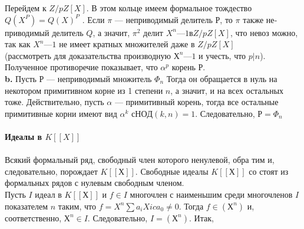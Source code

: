 \documentclass{../../template/mai_book}
\begin{document}
{{\hspace*{0pt}Перейдем к $Z/pZ[X]$. В этом кольце имеем формальное тождество\linebreak
$Q(X^{P}) = Q(X)^{P}$ . Если $\pi$ --- неприводимый делитель $Р$, то $\pi$ также не­\linebreak
приводимый делитель $Q$, а значит, $\pi^{2}$ делит $X^{n} — 1 в Z/pZ[X]$, что невоз­\linebreak
можно, так как $X^{n} — 1$ не имеет кратных множителей даже в $Z/pZ[X]$\\
\newpage
\noindent (рассмотреть для доказательства производную $Х^{n} — 1$ и учесть, \linebreak
что $p|n$). Полученное противоречие показывает, что $\alpha^{p}$ корень $Р$.\\
\hspace*{15pt}\textbf{b.} Пусть $Р$ — неприводимый множитель $\Phi_n$ Тогда он обращается\linebreak
в нуль на некотором примитивном корне из 1 степени $n$, а значит, и на\linebreak
всех остальных тоже. Действительно, пусть $\alpha$ — примитивный корень,\linebreak
тогда все остальные примитивные корни имеют вид $\alpha^{k}$ $с НОД(k, n) = 1$.\linebreak
Следовательно, $Р = \Phi_n$\\
\\
\noindent\textbf{Идеалы в $K[[X]]$}\\
\\
\hspace*{15pt} Всякий формальный ряд, свободный член которого ненулевой, обра­\linebreak
тим и, следовательно, порождает $K[[Х]]$. Свободные идеалы $K[[Х]]$ со­\linebreak
стоят из формальных рядов с нулевым свободным членом.\\
\hspace*{0pt} Пусть $I$ идеал в $K[[Х]]$ и $f \in I$ многочлен с наименьшим среди\linebreak
многочленов $I$ показателем $n$ таким, что $f = X^{n}\sum a_{i}X{i} c a_0 \neq 0$. Тогда\linebreak
$f \in (Х^{n})$ и, соответственно, $Х^{n} \in I$. Следовательно, $I = (Х^{n}).$ Итак,\linebreak
}}
\end{document}
